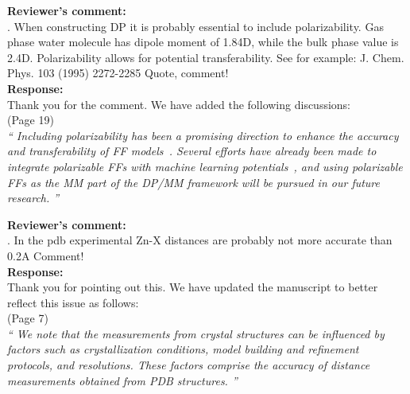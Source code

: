 \documentclass[doublespace,prb,aps,preprint]{revtex4}
\newcommand{\Quote}[1]{\textsl{``#1''}}
\newenvironment{Comment}{ {\bf \indent Reviewer's comment: \\} \setlength{\parindent}{1cm}  \sffamily }{ \ignorespacesafterend \\}
\newenvironment{Reply}{  {\bf Response: \\}  \setlength{\parindent}{1cm} \normalfont }{ \ignorespacesafterend \vspace{5mm}}
\newcommand{\HJ}[1]{\textcolor{red}{#1}}
\begin{document}
\begin{Comment}
4. When constructing DP it is probably essential to include polarizability.
Gas phase water molecule has dipole moment of 1.84D, while the bulk phase value is 2.4D.
Polarizability allows for potential transferability. See for example:
J. Chem. Phys. 103 (1995) 2272-2285
Quote, comment!
\end{Comment}
\begin{Reply}
    Thank you for the comment. We have added the following discussions: \\
    \newline
    (Page 19) \\
    \Quote{
        Including polarizability has been a promising direction to enhance the accuracy and transferability of FF models~\cite{jordan1995towards, ponder2010current, lemkul2016empirical, 17mpid}. 
        Several efforts have already been made to integrate polarizable FFs with machine learning potentials~\cite{inizan2023scalable, wang2023incorporating}, and using polarizable FFs as the MM part of the DP/MM framework will be pursued in our future research.
    }
\end{Reply}

\begin{Comment}
5. In the pdb experimental Zn-X distances are probably not more accurate than 0.2A
Comment!
\end{Comment}
\begin{Reply}
    Thank you for pointing out this. We have updated the manuscript to better reflect this issue as follows: \\
    \newline
    (Page 7) \\
    \Quote{
        We note that the measurements from crystal structures can be influenced by factors such as crystallization conditions,  model building and refinement protocols, and resolutions. These factors comprise the accuracy of distance measurements obtained from PDB structures. 
       } 
\end{Reply}
\end{document}
